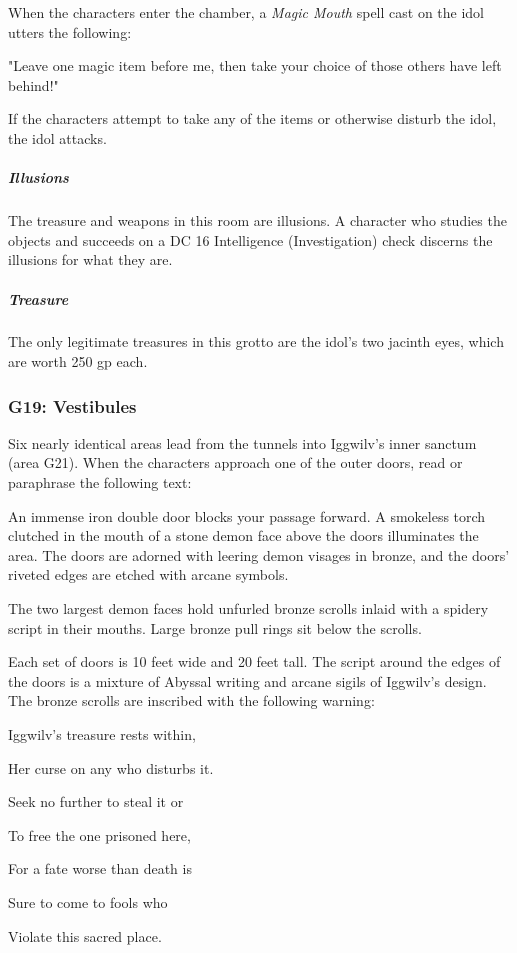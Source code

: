 \documentclass[10pt,a4paper,twoside,bg=print,twocolumn,openany,nodeprecatedcode]{dndbook}
\begin{document}
When the characters enter the chamber, a \textit{Magic Mouth} spell cast on the idol utters the following:

\begin{DndReadAloud}{}
"Leave one magic item before me, then take your choice of those others have left behind!"

\end{DndReadAloud}

If the characters attempt to take any of the items or otherwise disturb the idol, the idol attacks.

\subparagraph{Illusions}
The treasure and weapons in this room are illusions. A character who studies the objects and succeeds on a DC 16 Intelligence (Investigation) check discerns the illusions for what they are.

\subparagraph{Treasure}
The only legitimate treasures in this grotto are the idol's two jacinth eyes, which are worth 250 gp each.

\subsubsection{G19: Vestibules}
Six nearly identical areas lead from the tunnels into Iggwilv's inner sanctum (area G21). When the characters approach one of the outer doors, read or paraphrase the following text:

\begin{DndReadAloud}{}
An immense iron double door blocks your passage forward. A smokeless torch clutched in the mouth of a stone demon face above the doors illuminates the area. The doors are adorned with leering demon visages in bronze, and the doors' riveted edges are etched with arcane symbols.

The two largest demon faces hold unfurled bronze scrolls inlaid with a spidery script in their mouths. Large bronze pull rings sit below the scrolls.

\end{DndReadAloud}

Each set of doors is 10 feet wide and 20 feet tall. The script around the edges of the doors is a mixture of Abyssal writing and arcane sigils of Iggwilv's design. The bronze scrolls are inscribed with the following warning:

\begin{DndReadAloud}{}
Iggwilv's treasure rests within,

Her curse on any who disturbs it.

Seek no further to steal it or

To free the one prisoned here,

For a fate worse than death is

Sure to come to fools who

Violate this sacred place.

\end{DndReadAloud}
\end{document}
